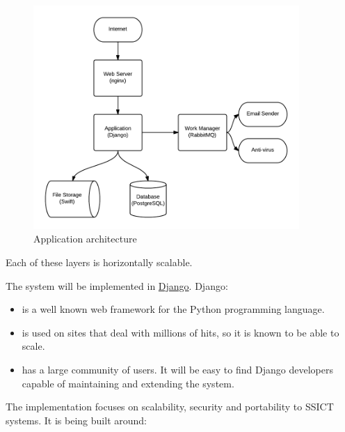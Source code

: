 \documentclass[12pt,a4paper,twosided]{article}
\begin{document}
\begin{figure}[htbp]
\centering
\includegraphics[width=0.9\textwidth]{./imgs/tech-overview.png}
\caption{Application architecture}
\end{figure}

Each of these layers is horizontally scalable.

The system will be implemented in \href{http://django.org}{Django}.
Django:

\begin{itemize}
\itemsep1pt\parskip0pt
\item
  is a well known web framework for the Python programming language.
\item
  is used on sites that deal with millions of hits, so it is known to be
  able to scale.
\item
  has a large community of users. It will be easy to find Django
  developers capable of maintaining and extending the system.
\end{itemize}

The implementation focuses on scalability, security and portability to
SSICT systems. It is being built around:
\end{document}
